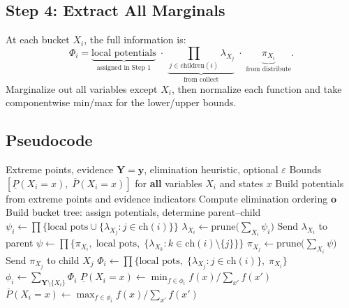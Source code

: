 \documentclass[11pt]{article}
\begin{document}
\subsection{Step 4: Extract All Marginals}

At each bucket $X_i$, the full information is:
\[
  \Phi_i = \underbrace{\text{local potentials}}_{\text{assigned in Step~1}}
  \;\cdot\; \underbrace{\prod_{j \in \mathrm{children}(i)} \lambda_{X_j}}_{\text{from collect}}
  \;\cdot\; \underbrace{\pi_{X_i}}_{\text{from distribute}}.
\]
Marginalize out all variables except $X_i$, then normalize each function and
take componentwise min/max for the lower/upper bounds.

\subsection{Pseudocode}

\begin{algorithm}[H]
\caption{Credal Cluster Tree Elimination (CTE)}
\label{alg:cte}
\begin{algorithmic}[1]
\Require Extreme points, evidence $\mathbf{Y} = \mathbf{y}$, elimination heuristic,
         optional $\varepsilon$
\Ensure Bounds $[\underline{P}(X_i{=}x),\; \overline{P}(X_i{=}x)]$ for \textbf{all}
        variables $X_i$ and states $x$
\Statex
\State Build potentials from extreme points and evidence indicators
\State Compute elimination ordering $\mathbf{o}$
\State Build bucket tree: assign potentials, determine parent--child
\Statex
{}
  \State $\psi_i \gets \prod\{\text{local pots} \cup \{\lambda_{X_j} : j \in \mathrm{ch}(i)\}\}$
  \State $\lambda_{X_i} \gets \mathrm{prune}\bigl(\sum_{X_i} \psi_i\bigr)$
  \State Send $\lambda_{X_i}$ to parent
\EndFor
\Statex
{}
    \State $\psi \gets \prod\{\pi_{X_i},\;\text{local pots},\;
           \{\lambda_{X_k} : k \in \mathrm{ch}(i) \setminus \{j\}\}\}$
    \State $\pi_{X_j} \gets \mathrm{prune}\bigl(\sum_{X_i} \psi\bigr)$
    \State Send $\pi_{X_j}$ to child $X_j$
  \EndFor
\EndFor
\Statex
{}
  \State $\Phi_i \gets \prod\{\text{local pots},\;
         \{\lambda_{X_j} : j \in \mathrm{ch}(i)\},\; \pi_{X_i}\}$
  \State $\phi_i \gets \sum_{\mathbf{Y} \setminus \{X_i\}} \Phi_i$
  \State $\underline{P}(X_i{=}x) \gets \min_{f \in \phi_i} f(x)/\sum_{x'} f(x')$
  \State $\overline{P}(X_i{=}x) \gets \max_{f \in \phi_i} f(x)/\sum_{x'} f(x')$
\EndFor
\end{algorithmic}
\end{algorithm}
\end{document}
